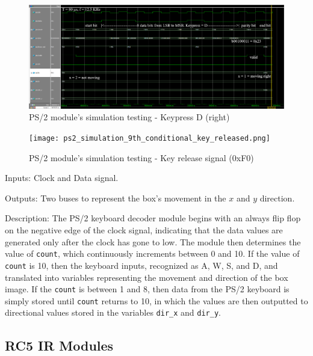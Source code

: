 \documentclass[12pt]{article}
\numberwithin{figure}{subsection}
\begin{document}
\newpage

\begin{figure}[ht]
  \centering
  \includegraphics[width=\textwidth]{ps2_simulation_7th_conditional.png}
  \caption{PS/2 module’s simulation testing - Keypress D (right)}
  \label{fig:ps2_simulation_7th_conditional}
\end{figure}

\begin{figure}[ht]
  \centering
  \texttt{[image: ps2\_simulation\_9th\_conditional\_key\_released.png]}
  \caption{PS/2 module’s simulation testing - Key release signal (0xF0)}
  \label{fig:ps2_simulation_9th_conditional_key_released}
\end{figure}

Inputs: Clock and Data signal.

Outputs: Two buses to represent the box’s movement in the $x$ and $y$ direction.

Description: The PS/2 keyboard decoder module begins with an always flip flop on the negative edge of the clock signal, indicating that the data values are generated only after the clock has gone to low. The module then determines the value of \texttt{count}, which continuously increments between 0 and 10. If the value of \texttt{count} is 10, then the keyboard inputs, recognized as A, W, S, and D, and translated into variables representing the movement and direction of the box image. If the \texttt{count} is between 1 and 8, then data from the PS/2 keyboard is simply stored until \texttt{count} returns to 10, in which the values are then outputted to directional values stored in the variables \texttt{dir_x} and \texttt{dir_y}.

\subsection{RC5 IR Modules}
\end{document}
